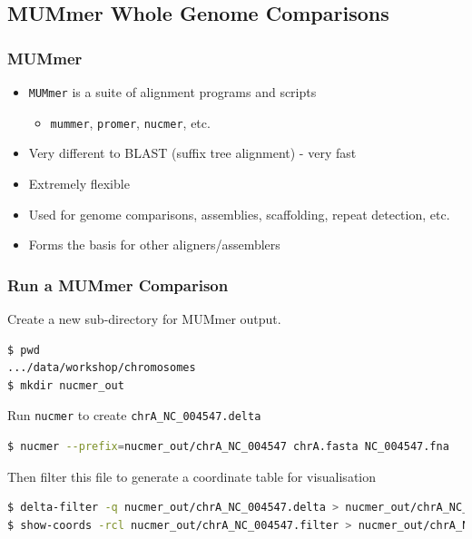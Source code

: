 %

\subsection{MUMmer Whole Genome Comparisons}
\begin{frame}
  \frametitle{MUMmer}
  \begin{itemize}
    \item \texttt{MUMmer} is a suite of alignment programs and scripts
    \begin{itemize}
      \item \texttt{mummer}, \texttt{promer}, \texttt{nucmer}, etc.
    \end{itemize}
    \item Very different to BLAST (suffix tree alignment) - very fast
    \item Extremely flexible
    \item Used for genome comparisons, assemblies, scaffolding, repeat detection, etc.
    \item Forms the basis for other aligners/assemblers
  \end{itemize}
\end{frame}

\begin{frame}[fragile]
  \frametitle{Run a MUMmer Comparison}
  Create a new sub-directory for MUMmer output.
\begin{lstlisting}[language=bash]
$ pwd
.../data/workshop/chromosomes
$ mkdir nucmer_out
\end{lstlisting}
    Run \texttt{nucmer} to create \texttt{chrA\_NC\_004547.delta} \\
\begin{lstlisting}[language=bash]
$ nucmer --prefix=nucmer_out/chrA_NC_004547 chrA.fasta NC_004547.fna
\end{lstlisting}
    Then filter this file to generate a coordinate table for visualisation
\begin{lstlisting}[language=bash]
$ delta-filter -q nucmer_out/chrA_NC_004547.delta > nucmer_out/chrA_NC_004547.filter
$ show-coords -rcl nucmer_out/chrA_NC_004547.filter > nucmer_out/chrA_NC_004547_filtered.coords
\end{lstlisting}
\end{frame}

